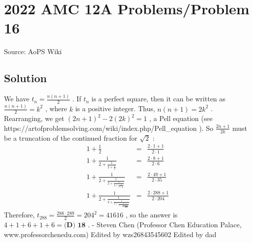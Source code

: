 \documentclass[12pt]{article}
\begin{document}
\section*{{2022 AMC 12A Problems/Problem 16}}
Source: AoPS Wiki

\subsection*{Solution}
We have $t_n = \frac{n (n+1)}{2}$ .
If $t_n$ is a perfect square, then it can be written as $\frac{n (n+1)}{2} = k^2$ ,
where $k$ is a positive integer. Thus, $n (n+1) = 2 k^2$ . Rearranging, we get $(2n+1)^2-2(2k)^2=1$ , a Pell equation (see https://artofproblemsolving.com/wiki/index.php/Pell_equation ). So $\frac{2n+1}{2k}$ must be a truncation of the continued fraction for $\sqrt{2}$ : \begin{eqnarray*} 1+\frac12&=&\frac{2\cdot1+1}{2\cdot1}\\ 1+\frac1{2+\frac1{2+\frac12}}&=&\frac{2\cdot8+1}{2\cdot6}\\ 1+\frac1{2+\frac1{2+\frac1{2+\frac1{2+\frac12}}}}&=&\frac{2\cdot49+1}{2\cdot35}\\ 1+\frac1{2+\frac1{2+\frac1{2+\frac1{2+\frac1{2+\frac1{2+\frac12}}}}}}&=&\frac{2\cdot288+1}{2\cdot204} \end{eqnarray*} Therefore, $t_{288} = \frac{288\cdot289}{2} = 204^2 = 41616$ , so the answer is $4+1+6+1+6=\boxed{\textbf{(D) 18}}$ . - Steven Chen (Professor Chen Education Palace, www.professorchenedu.com) Edited by wzs26843545602
Edited by dad
\end{document}
